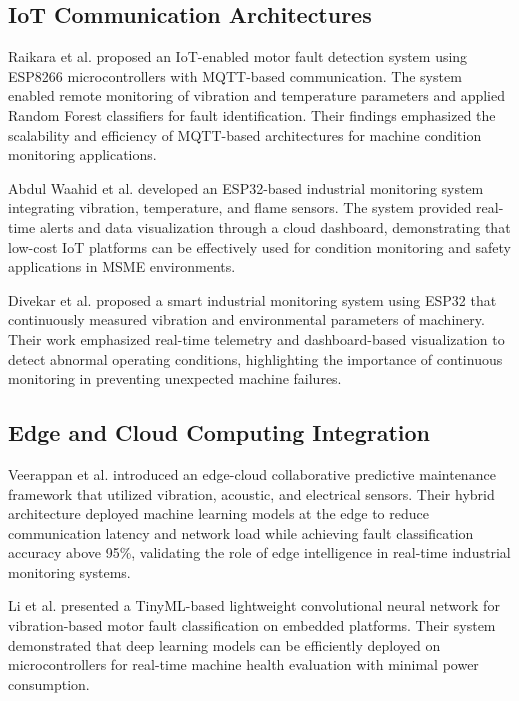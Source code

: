\documentclass[conference]{IEEEtran}
\begin{document}
\subsection{IoT Communication Architectures}

Raikara et al. \cite{raikara2025} proposed an IoT-enabled motor fault detection system using ESP8266 microcontrollers with MQTT-based communication. The system enabled remote monitoring of vibration and temperature parameters and applied Random Forest classifiers for fault identification. Their findings emphasized the scalability and efficiency of MQTT-based architectures for machine condition monitoring applications.

Abdul Waahid et al. \cite{waahid2025} developed an ESP32-based industrial monitoring system integrating vibration, temperature, and flame sensors. The system provided real-time alerts and data visualization through a cloud dashboard, demonstrating that low-cost IoT platforms can be effectively used for condition monitoring and safety applications in MSME environments.

Divekar et al. \cite{divekar2025} proposed a smart industrial monitoring system using ESP32 that continuously measured vibration and environmental parameters of machinery. Their work emphasized real-time telemetry and dashboard-based visualization to detect abnormal operating conditions, highlighting the importance of continuous monitoring in preventing unexpected machine failures.

\subsection{Edge and Cloud Computing Integration}

Veerappan et al. \cite{veerappan2025} introduced an edge-cloud collaborative predictive maintenance framework that utilized vibration, acoustic, and electrical sensors. Their hybrid architecture deployed machine learning models at the edge to reduce communication latency and network load while achieving fault classification accuracy above 95\%, validating the role of edge intelligence in real-time industrial monitoring systems.

Li et al. \cite{li2024} presented a TinyML-based lightweight convolutional neural network for vibration-based motor fault classification on embedded platforms. Their system demonstrated that deep learning models can be efficiently deployed on microcontrollers for real-time machine health evaluation with minimal power consumption.
\end{document}
